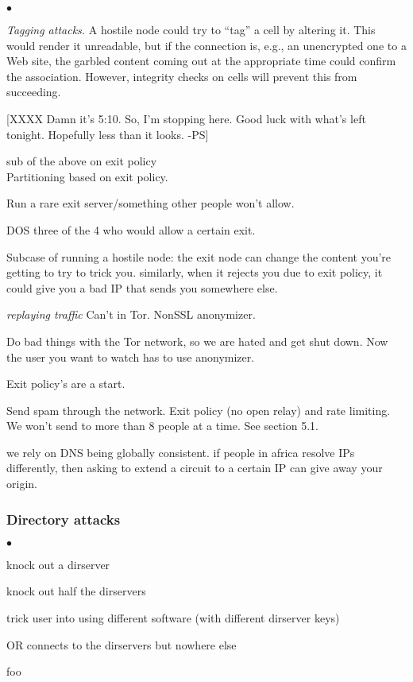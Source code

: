 \documentclass[times,10pt,twocolumn]{article}
\newenvironment{tightlist}{\begin{list}{$\bullet$}{
  \setlength{\itemsep}{0mm}
    \setlength{\parsep}{0mm}
    }}{\end{list}}
\begin{document}
\begin{tightlist}
\item \emph{Tagging attacks.} A hostile node could try to ``tag'' a
  cell by altering it. This would render it unreadable, but if the
  connection is, e.g., an unencrypted one to a Web site, the garbled
  content coming out at the appropriate time could confirm the
  association. However, integrity checks on cells will prevent this
  from succeeding.


[XXXX Damn it's 5:10. So, I'm stopping here. Good luck with what's left
tonight. Hopefully less than it looks. -PS]


\item sub of the above on exit policy\\
Partitioning based on exit policy.

Run a rare exit server/something other people won't allow.

DOS three of the 4 who would allow a certain exit.



Subcase of running a hostile node: 
the exit node can change the content you're getting to try to
trick you. similarly, when it rejects you due to exit policy,
it could give you a bad IP that sends you somewhere else.
\item \emph{replaying traffic} Can't in Tor. NonSSL anonymizer.

\item Do bad things with the Tor network, so we are hated and
get shut down. Now the user you want to watch has to use anonymizer.

Exit policy's are a start.

\item Send spam through the network. Exit policy (no open relay) and
  rate limiting. We won't send to more than 8 people at a time.  See
  section 5.1.

we rely on DNS being globally consistent. if people in africa resolve
IPs differently, then asking to extend a circuit to a certain IP can
give away your origin.
\end{tightlist}

\subsubsection*{Directory attacks}
\begin{tightlist}
\item knock out a dirserver
\item knock out half the dirservers
\item trick user into using different software (with different dirserver
keys)
\item OR connects to the dirservers but nowhere else
\item foo
\end{tightlist}
\end{document}
